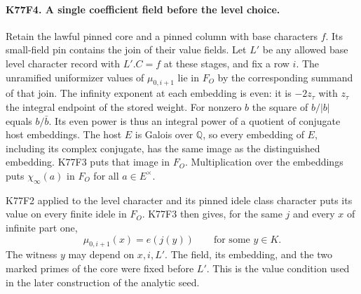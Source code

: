 \paragraph{K77F4. A single coefficient field before the level choice.}
Retain the lawful pinned core and a pinned column with base characters
$f$. Its small-field pin contains the join of their value fields.
Let $L'$ be any allowed base level character record with $L'.C=f$
at these stages, and fix a row $i$. The unramified uniformizer
values of $\mu_{0,i+1}$ lie in $F_O$ by the corresponding summand
of that join. The infinity exponent at each embedding is even:
it is $-2z_\tau$ with $z_\tau$ the integral endpoint of the
stored weight. For nonzero $b$ the square of $b/|b|$ equals
$b/\bar b$. Its even power is thus an integral power of a quotient
of conjugate host embeddings. The host $E$ is Galois over
$\mathbb Q$, so every embedding of $E$, including its complex
conjugate, has the same image as the distinguished embedding.
K77F3 puts that image in $F_O$. Multiplication over the
embeddings puts $\chi_\infty(a)$ in $F_O$ for all $a\in E^\times$.

K77F2 applied to the level character and its pinned idele class
character puts its value on every finite idele in $F_O$. K77F3
then gives, for the same $j$ and every $x$ of infinite part one,
\[
           \mu_{0,i+1}(x)=e(j(y))\qquad\text{for some }y\in K .
\]
The witness $y$ may depend on $x,i,L'$. The field, its embedding,
and the two marked primes of the core were fixed before $L'$.
This is the value condition used in the later construction of
the analytic seed.

